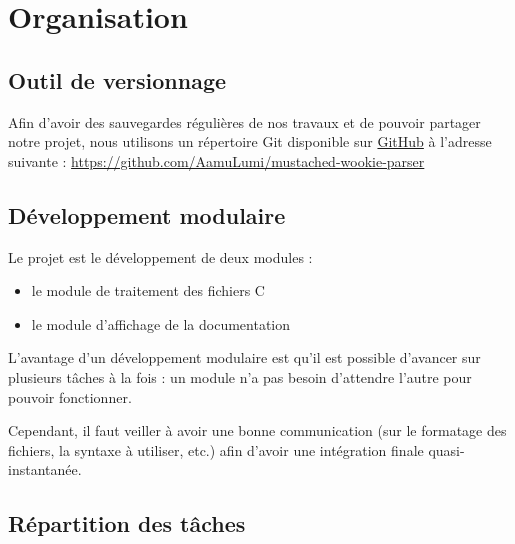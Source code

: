 \chapter{Organisation}

\section{Outil de versionnage}

Afin d'avoir des sauvegardes régulières de nos travaux et de pouvoir partager notre projet, nous utilisons un répertoire Git disponible sur \href{https://github.com}{GitHub} à l'adresse suivante : \href{https://github.com/AamuLumi/mustached-wookie-parser}{https://github.com/AamuLumi/mustached-wookie-parser}

\section{Développement modulaire}

Le projet est le développement de deux modules :
\begin{itemize}
\item le module de traitement des fichiers C
\item le module d'affichage de la documentation
\end{itemize}\par\bigskip
L'avantage d'un développement modulaire est qu'il est possible d'avancer sur plusieurs tâches à la fois : un module n'a pas besoin d'attendre l'autre pour pouvoir fonctionner.\par 
Cependant, il faut veiller à avoir une bonne communication (sur le formatage des fichiers, la syntaxe à utiliser, etc.) afin d'avoir une intégration finale quasi-instantanée.

\section{Répartition des tâches}